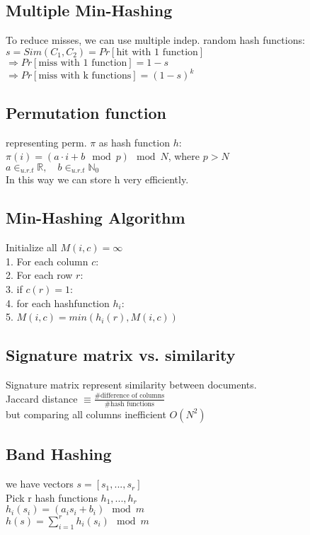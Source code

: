 \subsection*{Multiple Min-Hashing}
To reduce misses, we can use multiple indep. random hash functions:\\
$s = Sim(C_1, C_2) = Pr[\text{hit with 1 function}]$\\
$\Rightarrow Pr[\text{miss with 1 function}] = 1-s$\\
$\Rightarrow Pr[\text{miss with k functions}] = (1-s)^k$

\subsection*{Permutation function}
representing perm. $\pi$ as hash function $h$:\\
$\pi(i) = (a\cdot i + b \mod p) \mod N$, where $p > N$\\
$a \in_{u.r.t} \mathbb{R},\quad b \in_{u.r.t} \mathbb{N}_0$\\
In this way we can store h very efficiently.

\subsection*{Min-Hashing Algorithm}
Initialize all $M(i,c) = \infty$\\
1. For each column $c$:\\
2. For each row $r$:\\
3. if $c(r) = 1$:\\
4. for each hashfunction $h_i$:\\
5. $M(i,c) = min(h_i(r), M(i,c))$ 

\subsection*{Signature matrix vs. similarity}
Signature matrix represent similarity between documents.\\
Jaccard distance $\equiv \frac{\text{\# difference of columns}}{\text{\# hash functions}}$\\
but comparing all columns inefficient $O(N^2)$

\subsection*{Band Hashing}
we have vectors $s = [s_1,...,s_r]$\\
Pick r hash functions $h_1,...,h_r$\\
$h_i(s_i) = (a_i s_i + b_i) \mod m$\\
$h(s) = \sum_{i=1}^r h_i(s_i) \mod m$

